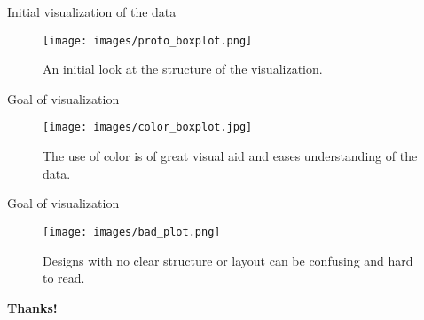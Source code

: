 \documentclass{beamer}
\begin{document}
\begin{frame}{Initial visualization of the data}
    \begin{figure}[!h]
        \centering
        \texttt{[image: images/proto\_boxplot.png]}
        \caption{An initial look at the structure of the visualization.}
    \end{figure}
\end{frame}

\begin{frame}{Goal of visualization}
    \begin{figure}[!h]
        \centering
        \texttt{[image: images/color\_boxplot.jpg]}
        \caption{The use of color is of great visual aid and eases understanding of the data.}
    \end{figure}
\end{frame}

\begin{frame}{Goal of visualization}
    \begin{figure}[!h]
        \centering
        \texttt{[image: images/bad\_plot.png]}
        \caption{Designs with no clear structure or layout can be confusing and hard to read.}
    \end{figure}
\end{frame}

\begin{frame}
    \centering
    \Huge\textbf{Thanks!}
\end{frame}
\end{document}
